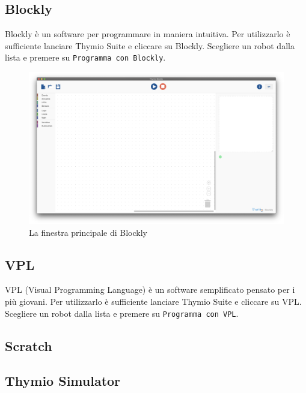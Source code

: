 \documentclass[12pt]{article}
\begin{document}
	\subsection{Blockly}

		Blockly è un software per programmare in maniera intuitiva. Per utilizzarlo è sufficiente lanciare Thymio Suite e cliccare su Blockly. Scegliere un robot dalla lista e premere su \texttt{Programma con Blockly}.
		
		\begin{figure}[H]
			\includegraphics[width=\textwidth]{img/blockly.png}
			\caption{La finestra principale di Blockly}
			\label{aseba1}
		\end{figure}
		
	\subsection{VPL}
	
		VPL (Visual Programming Language) è un software semplificato pensato per i più giovani. Per utilizzarlo è sufficiente lanciare Thymio Suite e cliccare su VPL. Scegliere un robot dalla lista e premere su \texttt{Programma con VPL}.
		
		
	\subsection{Scratch}
	
		
		
	\subsection{Thymio Simulator}
	
\end{document}
